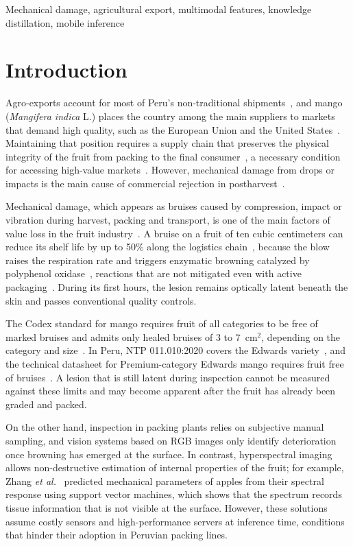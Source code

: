 \documentclass[journal]{IEEEtran}
\begin{document}
\begin{IEEEkeywords}
Mechanical damage, agricultural export, multimodal features, knowledge distillation, mobile inference
\end{IEEEkeywords}

\section{Introduction}\label{sec:intro}
Agro-exports account for most of Peru's non-traditional shipments~\cite{soriano2025}, and mango (\emph{Mangifera indica} L.) places the country among the main suppliers to markets that demand high quality, such as the European Union and the United States~\cite{cosio2026}. Maintaining that position requires a supply chain that preserves the physical integrity of the fruit from packing to the final consumer~\cite{jayathilaka2026}, a necessary condition for accessing high-value markets~\cite{sanchez2023}. However, mechanical damage from drops or impacts is the main cause of commercial rejection in postharvest~\cite{le2022}.

Mechanical damage, which appears as bruises caused by compression, impact or vibration during harvest, packing and transport, is one of the main factors of value loss in the fruit industry~\cite{liu2025}. A bruise on a fruit of ten cubic centimeters can reduce its shelf life by up to 50\% along the logistics chain~\cite{gamez2022}, because the blow raises the respiration rate and triggers enzymatic browning catalyzed by polyphenol oxidase~\cite{queiroz2008}, reactions that are not mitigated even with active packaging~\cite{hao2025}. During its first hours, the lesion remains optically latent beneath the skin and passes conventional quality controls.

The Codex standard for mango requires fruit of all categories to be free of marked bruises and admits only healed bruises of 3 to 7~cm$^2$, depending on the category and size~\cite{codex2005}. In Peru, NTP 011.010:2020 covers the Edwards variety~\cite{inacal2020}, and the technical datasheet for Premium-category Edwards mango requires fruit free of bruises~\cite{ficha2021}. A lesion that is still latent during inspection cannot be measured against these limits and may become apparent after the fruit has already been graded and packed.

On the other hand, inspection in packing plants relies on subjective manual sampling, and vision systems based on RGB images only identify deterioration once browning has emerged at the surface. In contrast, hyperspectral imaging allows non-destructive estimation of internal properties of the fruit; for example, Zhang \emph{et al.}~\cite{zhang2022} predicted mechanical parameters of apples from their spectral response using support vector machines, which shows that the spectrum records tissue information that is not visible at the surface. However, these solutions assume costly sensors and high-performance servers at inference time, conditions that hinder their adoption in Peruvian packing lines.
\end{document}
